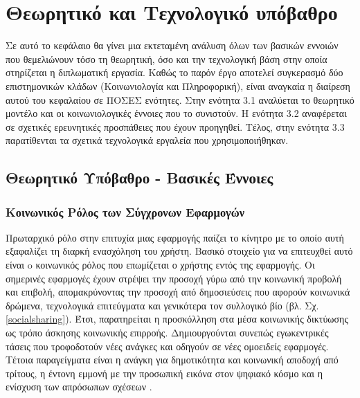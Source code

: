 \chapter{Θεωρητικό και Τεχνολογικό υπόβαθρο}
\label{chap3}

Σε αυτό το κεφάλαιο θα γίνει μια εκτεταμένη ανάλυση όλων των βασικών εννοιών που θεμελιώνουν τόσο τη θεωρητική, όσο και την τεχνολογική βάση στην οποία στηρίζεται η διπλωματική εργασία. Καθώς το παρόν έργο αποτελεί συγκερασμό δύο επιστημονικών κλάδων (Κοινωνιολογία και Πληροφορική), είναι αναγκαία η διαίρεση αυτού του κεφαλαίου σε ΠΟΣΕΣ ενότητες. Στην ενότητα 3.1 αναλύεται το θεωρητικό μοντέλο και οι κοινωνιολογικές έννοιες που το συνιστούν. Η ενότητα 3.2 αναφέρεται σε σχετικές ερευνητικές προσπάθειες που έχουν προηγηθεί. Τέλος, στην ενότητα 3.3 παρατίθενται τα σχετικά τεχνολογικά εργαλεία που χρησιμοποιήθηκαν.

\section{Θεωρητικό Υπόβαθρο - Βασικές Έννοιες}

\subsection{Κοινωνικός Ρόλος των Σύγχρονων Εφαρμογών}
Πρωταρχικό ρόλο στην επιτυχία μιας εφαρμογής παίζει το κίνητρο με το οποίο αυτή εξαφαλίζει τη διαρκή ενασχόληση του χρήστη. Βασικό στοιχείο για να επιτευχθεί αυτό είναι o κοινωνικός ρόλος που επωμίζεται ο χρήστης εντός της εφαρμογής. Oι σημερινές εφαρμογές έχουν στρέψει την προσοχή γύρω από την κοινωνική προβολή και επιβολή, απομακρύνοντας την προσοχή από δημοσιεύσεις που αφορούν κοινωνικά δρώμενα, τεχνολογικά επιτεύγματα και γενικότερα τον συλλογικό βίο (βλ. Σχ. \ref{socialsharing}). Έτσι, παρατηρείται η προσκόλληση στα μέσα κοινωνικής δικτύωσης ως τρόπο άσκησης κοινωνικής επιρροής. Δημιουργούνται συνεπώς εγωκεντρικές τάσεις που τροφοδοτούν νέες ανάγκες και οδηγούν σε νέες ομοειδείς εφαρμογές. Τέτοια παραγείγματα είναι η ανάγκη για δημοτικότητα και κοινωνική αποδοχή \cite{[IND+16]} από τρίτους, η έντονη εμμονή με την προσωπική εικόνα στον ψηφιακό κόσμο και η ενίσχυση των απρόσωπων σχέσεων \cite{[JAR+18]}. 

